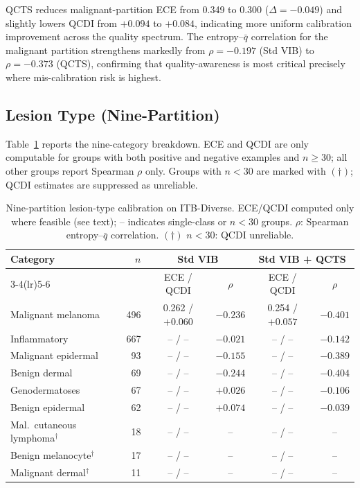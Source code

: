 \documentclass{bmvc2k}
\newcommand{\qbar}{\bar{q}}
\begin{document}
QCTS reduces malignant-partition ECE from 0.349 to 0.300 ($\Delta{=}{-}0.049$)
and slightly lowers QCDI from $+0.094$ to $+0.084$, indicating more
uniform calibration improvement across the quality spectrum. The
entropy--$\qbar$ correlation for the malignant partition strengthens markedly
from $\rho{=}{-}0.197$ (Std VIB) to $\rho{=}{-}0.373$ (QCTS), confirming
that quality-awareness is most critical precisely where mis-calibration risk
is highest.

\subsection{Lesion Type (Nine-Partition)}
\label{app:fairness_nine}

Table~\ref{tab:fairness_nine} reports the nine-category breakdown.
ECE and QCDI are only computable for groups with both positive and negative
examples and $n{\ge}30$; all other groups report Spearman $\rho$ only.
Groups with $n{<}30$ are marked with $(\dagger)$; QCDI estimates are
suppressed as unreliable.

\begin{table}[h]
\centering
\caption{Nine-partition lesion-type calibration on ITB-Diverse.
  ECE/QCDI computed only where feasible (see text); -- indicates
  single-class or $n{<}30$ groups. $\rho$: Spearman entropy--$\qbar$
  correlation. $(\dagger)$ $n{<}30$: QCDI unreliable.}
\label{tab:fairness_nine}
\footnotesize
\begin{tabular}{lrcccc}
\toprule
Category & $n$ & \multicolumn{2}{c}{Std VIB} & \multicolumn{2}{c}{Std VIB + QCTS} \\
\cmidrule(lr){3-4}\cmidrule(lr){5-6}
& & ECE / QCDI & $\rho$ & ECE / QCDI & $\rho$ \\
\midrule
Malignant melanoma     & 496 & 0.262 / $+0.060$ & $-0.236$ & 0.254 / $+0.057$ & $-0.401$ \\
Inflammatory           & 667 & -- / --           & $-0.021$ & -- / --           & $-0.142$ \\
Malignant epidermal    &  93 & -- / --           & $-0.155$ & -- / --           & $-0.389$ \\
Benign dermal          &  69 & -- / --           & $-0.244$ & -- / --           & $-0.404$ \\
Genodermatoses         &  67 & -- / --           & $+0.026$ & -- / --           & $-0.106$ \\
Benign epidermal       &  62 & -- / --           & $+0.074$ & -- / --           & $-0.039$ \\
Mal.\ cutaneous lymphoma$^{\dagger}$ & 18 & -- / -- & -- & -- / -- & -- \\
Benign melanocyte$^{\dagger}$ & 17 & -- / -- & -- & -- / -- & -- \\
Malignant dermal$^{\dagger}$ & 11 & -- / -- & -- & -- / -- & -- \\
\bottomrule
\end{tabular}
\end{table}
\end{document}
